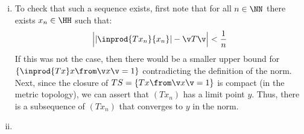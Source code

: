 \begin{enumerate}[(i)]
\item To check that such a sequence exists, first note that for all $n\in \NN$ there exists $x_n\in \HH$ such that:
$$\Big| |\inprod{Tx_n}{x_n}| - \v T\v\Big|<\frac 1n$$
If this was not the case, then there would be a smaller upper bound for $\{ \inprod {Tx}x\from \v x\v=1\}$ contradicting the definition of the norm.
Next, since the closure of $TS=\{Tx\from \v x\v =1\}$ is compact (in the metric topology), we can assert that $(Tx_n)$ has a limit point $y$.
Thus, there is a subsequence of $(Tx_n)$ that converges to $y$ in the norm.
 
\item  
\end{enumerate}
